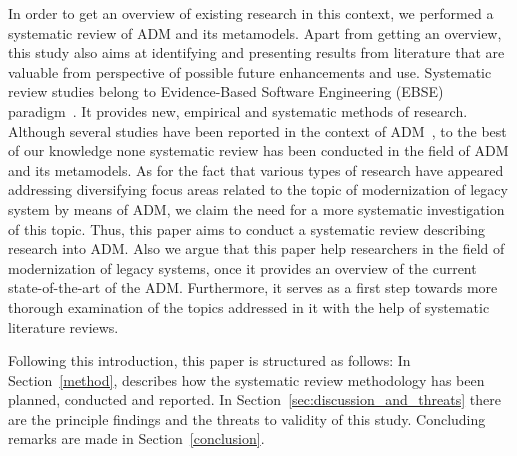 In order to get an overview of existing research in this context, we performed a systematic review of ADM and its metamodels. Apart from getting an overview, this study also aims at identifying and presenting results from literature that are valuable from perspective of possible future enhancements and use. Systematic review studies belong to Evidence-Based Software Engineering (EBSE) paradigm~\cite{Kitchenham}. It provides new, empirical and systematic methods of research. Although several studies have been reported in the context of ADM~\cite{PerezCastillo20121370, SMR:SMR582, FuentesFernandez2012247, PrezCastillo2011519}, to the best of our knowledge none systematic review has been conducted in the field of ADM and its metamodels. As for the fact that various types of research have appeared addressing diversifying focus areas related to the topic of modernization of legacy system by means of ADM, we claim the need for a more systematic investigation of this topic. Thus, this paper aims to conduct a systematic review describing research into ADM. Also we argue that this paper help researchers in the field of modernization of legacy systems, once it provides an overview of the current state-of-the-art of the ADM. Furthermore, it serves as a first step towards more thorough examination of the topics addressed in it with the help of systematic literature reviews.

Following this introduction, this paper is structured as follows: In Section~\ref{method}, describes how the systematic review methodology has been planned, conducted and reported. In Section~\ref{sec:discussion_and_threats} there are the principle findings and the threats to validity of this study. Concluding remarks are made in Section~\ref{conclusion}.